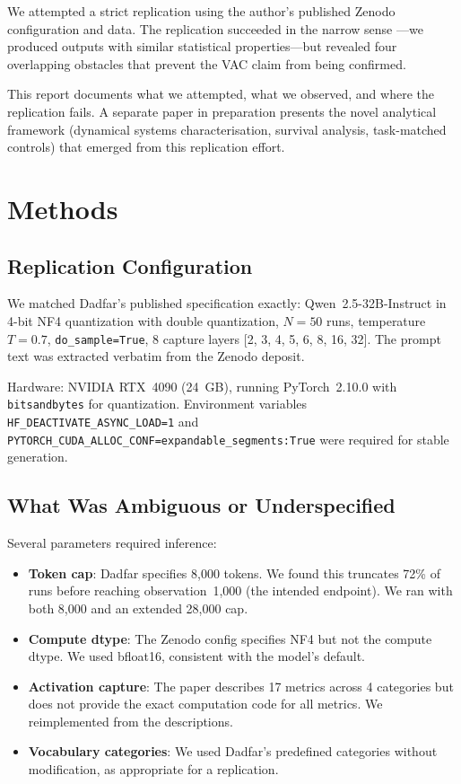 \documentclass[11pt]{article}
\begin{document}
We attempted a strict replication using the author's published Zenodo
configuration and data. The replication succeeded in the narrow sense
---we produced outputs with similar statistical properties---but
revealed four overlapping obstacles that prevent the VAC claim from
being confirmed.

This report documents what we attempted, what we observed, and where
the replication fails. A separate paper in preparation presents the
novel analytical framework (dynamical systems characterisation, survival
analysis, task-matched controls) that emerged from this replication
effort.


\section{Methods}

\subsection{Replication Configuration}

We matched Dadfar's published specification exactly: Qwen~2.5-32B-Instruct
\citep{qwen2024} in 4-bit NF4 quantization with double quantization,
$N = 50$ runs, temperature $T = 0.7$, \texttt{do\_sample=True}, 8 capture
layers [2, 3, 4, 5, 6, 8, 16, 32]. The prompt text was extracted verbatim
from the Zenodo deposit.

Hardware: NVIDIA RTX~4090 (24~GB), running PyTorch~2.10.0 with
\texttt{bitsandbytes} for quantization. Environment variables
\texttt{HF\_DEACTIVATE\_ASYNC\_LOAD=1} and
\texttt{PYTORCH\_CUDA\_ALLOC\_CONF=expandable\_segments:True} were
required for stable generation.

\subsection{What Was Ambiguous or Underspecified}

Several parameters required inference:
\begin{itemize}
  \item \textbf{Token cap}: Dadfar specifies 8,000 tokens. We found this
    truncates 72\% of runs before reaching observation~1,000 (the
    intended endpoint). We ran with both 8,000 and an extended 28,000 cap.
  \item \textbf{Compute dtype}: The Zenodo config specifies NF4 but not
    the compute dtype. We used bfloat16, consistent with the model's
    default.
  \item \textbf{Activation capture}: The paper describes 17 metrics across
    4 categories but does not provide the exact computation code for all
    metrics. We reimplemented from the descriptions.
  \item \textbf{Vocabulary categories}: We used Dadfar's predefined
    categories without modification, as appropriate for a replication.
\end{itemize}
\end{document}

